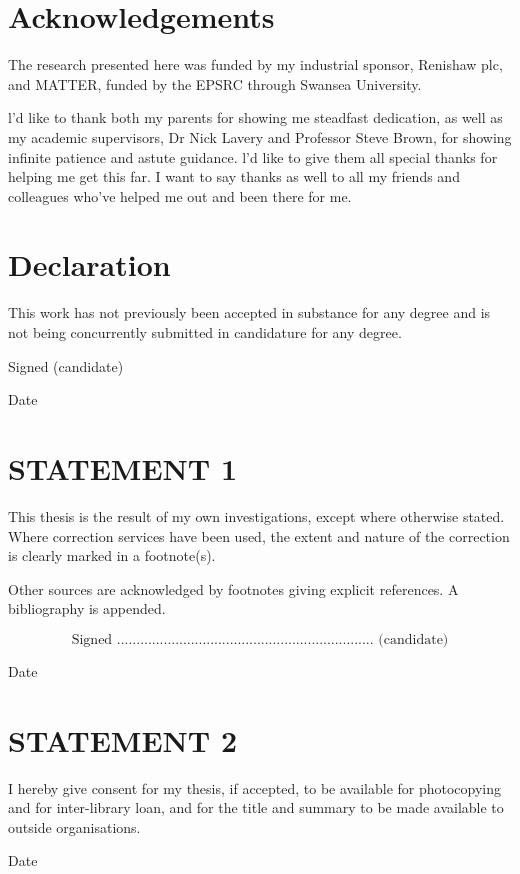 \documentclass[10pt]{article}
\begin{document}
\section*{Acknowledgements}
The research presented here was funded by my industrial sponsor, Renishaw plc, and MATTER, funded by the EPSRC through Swansea University.

l'd like to thank both my parents for showing me steadfast dedication, as well as my academic supervisors, Dr Nick Lavery and Professor Steve Brown, for showing infinite patience and astute guidance. l'd like to give them all special thanks for helping me get this far. I want to say thanks as well to all my friends and colleagues who've helped me out and been there for me.

\section*{Declaration }
This work has not previously been accepted in substance for any degree and is not being concurrently submitted in candidature for any degree.

Signed (candidate)

Date

\section*{STATEMENT 1}
This thesis is the result of my own investigations, except where otherwise stated. Where correction services have been used, the extent and nature of the correction is clearly marked in a footnote(s).

Other sources are acknowledged by footnotes giving explicit references. A bibliography is appended.

$$
\text { Signed .................................................................. (candidate) }
$$

Date

\section*{STATEMENT 2}
I hereby give consent for my thesis, if accepted, to be available for photocopying and for inter-library loan, and for the title and summary to be made available to outside organisations.

Date
\end{document}
